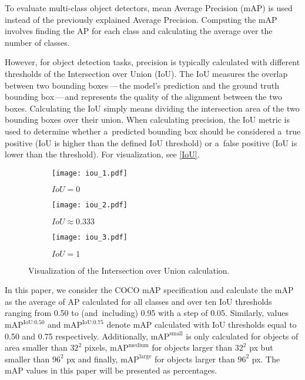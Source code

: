 To evaluate multi-class object detectors, mean Average Precision (mAP) is used
instead of the previously explained Average Precision. Computing the mAP
involves finding the AP for each class and calculating the average over the
number of classes.

However, for object detection tasks, precision is typically calculated with
different thresholds of the Intersection over Union (IoU). The IoU
measures the overlap between two bounding boxes\,---\,the model's
prediction and the ground truth bounding box\,---\,and represents the quality of the
alignment between the two boxes. Calculating the IoU simply means dividing the
intersection area of the two bounding boxes over their union. When calculating
precision, the IoU metric is used to determine whether a~predicted bounding box
should be considered a~true positive (IoU is higher than the defined IoU
threshold) or a~false positive (IoU is lower than the threshold). For
visualization, see \autoref{IoU}.

\begin{figure}[t]
    \centering
    \begin{subfigure}[b]{0.3125\textwidth}
        \texttt{[image: iou\_1.pdf]}
        \caption{$IoU = 0$}
    \end{subfigure}
    \hfill
    \begin{subfigure}[b]{0.2272727\textwidth}
        \texttt{[image: iou\_2.pdf]}
        \caption{$IoU \approx 0.333$}
    \end{subfigure}
    \hfill
    \begin{subfigure}[b]{0.15151515\textwidth}
        \texttt{[image: iou\_3.pdf]}
        \caption{$IoU = 1$}
    \end{subfigure}

    \caption{Visualization of the Intersection over Union calculation.}
    \label{IoU}
\end{figure}

In this paper, we consider the COCO mAP specification and calculate the mAP as
the average of AP calculated for all classes and over ten IoU thresholds ranging
from \num{0.50} to (and~including) \num{0.95} with a step of \num{0.05}.
Similarly, values $\text{mAP}^{\text{IoU:0.50}}$ and
$\text{mAP}^{\text{IoU:0.75}}$ denote mAP calculated with IoU thresholds equal
to \num{0.50} and \num{0.75} respectively. Additionally,
$\text{mAP}^{\text{small}}$ is only calculated for objects of area smaller than
$32^2$ pixels, $\text{mAP}^{\text{medium}}$ for objects larger than $32^2$ px
but smaller than $96^2$ px and finally, $\text{mAP}^{\text{large}}$ for objects
larger than $96^2$ px. The mAP values in this paper will be presented as
percentages.


